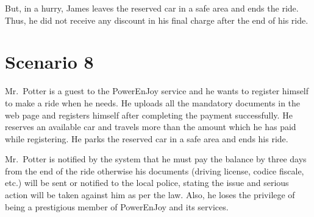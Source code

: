 But, in a hurry, James leaves the reserved car in a safe area and ends the ride. Thus, he did not receive any discount in his final charge after the end of his ride.

\section{Scenario 8}
Mr.~Potter is a guest to the PowerEnJoy service and he wants to register himself to make a ride when he needs. He uploads all the mandatory documents in the web page and registers himself after completing the payment successfully. He reserves an available car and travels more than the amount which he has paid while registering. He parks the reserved car in a safe area and ends his ride.

Mr.~Potter is notified by the system that he must pay the balance by three days from the end of the ride otherwise his documents (driving license, codice fiscale, etc.) will be sent or notified to the local police, stating the issue and serious action will be taken against him as per the law. Also, he loses the privilege of being a prestigious member of PowerEnJoy and its services.